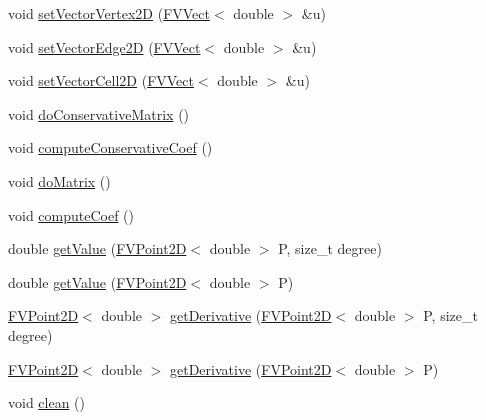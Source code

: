 \begin{DoxyCompactItemize}
\item 
void \hyperlink{classFVRecons2D_ab7a2586dc96682fbdfd945755620f3cc}{setVectorVertex2D} (\hyperlink{classFVVect}{FVVect}$<$ double $>$ \&u)
\item 
void \hyperlink{classFVRecons2D_a2f6606e5da89f8268f32d1f63dff07d9}{setVectorEdge2D} (\hyperlink{classFVVect}{FVVect}$<$ double $>$ \&u)
\item 
void \hyperlink{classFVRecons2D_aedbe092efe0b4fb30f1c6009988e649d}{setVectorCell2D} (\hyperlink{classFVVect}{FVVect}$<$ double $>$ \&u)
\item 
void \hyperlink{classFVRecons2D_ace350e893da1fc1e34121063885b4d66}{doConservativeMatrix} ()
\item 
void \hyperlink{classFVRecons2D_a8d6d0de3223ec5b38427aac5a0b4b2a0}{computeConservativeCoef} ()
\item 
void \hyperlink{classFVRecons2D_a778ff476790db0a772b0de4670138fd1}{doMatrix} ()
\item 
void \hyperlink{classFVRecons2D_a542380877cfbecb217d6079b325bcc9b}{computeCoef} ()
\item 
double \hyperlink{classFVRecons2D_ac1cc4ea8df74c7a534d6cfbcdcfbb2f9}{getValue} (\hyperlink{classFVPoint2D}{FVPoint2D}$<$ double $>$ P, size\_\-t degree)
\item 
double \hyperlink{classFVRecons2D_a8813590c93228ac4cab9e6c3c1d2dd99}{getValue} (\hyperlink{classFVPoint2D}{FVPoint2D}$<$ double $>$ P)
\item 
\hyperlink{classFVPoint2D}{FVPoint2D}$<$ double $>$ \hyperlink{classFVRecons2D_a5f177a63e2041865e9c629f0eb4a06a5}{getDerivative} (\hyperlink{classFVPoint2D}{FVPoint2D}$<$ double $>$ P, size\_\-t degree)
\item 
\hyperlink{classFVPoint2D}{FVPoint2D}$<$ double $>$ \hyperlink{classFVRecons2D_a950d06dbe4a1c248ba83ac1689156272}{getDerivative} (\hyperlink{classFVPoint2D}{FVPoint2D}$<$ double $>$ P)
\item 
void \hyperlink{classFVRecons2D_a2bbe646c052baf99f04a367ef6031d74}{clean} ()
\end{DoxyCompactItemize}


